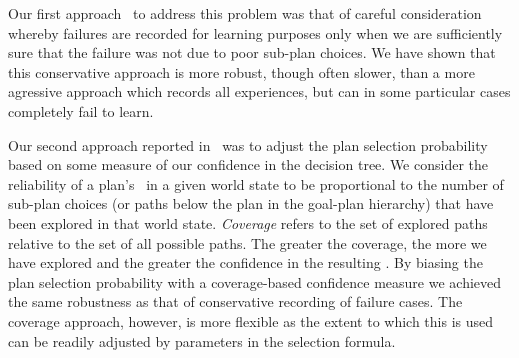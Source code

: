 

Our first approach~\cite{Airiau:IJAT:09} to address this problem was that 
of careful consideration whereby failures are recorded for learning purposes 
only when we are sufficiently sure that the failure was not due to poor
sub-plan choices. 
We have shown that this conservative approach is more robust, 
though often slower, than a more agressive
approach which records all experiences, but can in some particular cases
completely fail to learn.

Our second approach reported in~\cite{Singh:AAMAS10} was to
adjust the plan selection probability based on some measure of 
our confidence in the decision tree.
%
We consider the reliability of a plan's \dt\ in a given 
world state to be proportional to the number of sub-plan choices (or paths
below the plan in the goal-plan hierarchy) that have been
explored in that world state. 
%
{\it Coverage} refers to the set of explored paths relative to the set of all possible paths.
%
The greater the coverage, the more we have explored and the greater the confidence in the resulting \dt.
%
By biasing the plan selection probability with a coverage-based confidence
measure we achieved the same robustness as that of conservative recording of 
failure cases. The coverage approach, however, is more 
flexible as the extent to which this is used can be
readily adjusted by parameters in the selection formula. 

